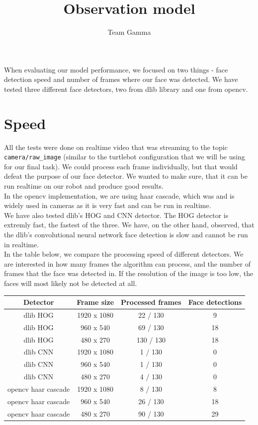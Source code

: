 \documentclass[12pt,a4paper]{report}
\author{Team Gamma}
\title{Observation model}
\date{}
\begin{document}
	
	\maketitle
	
	When evaluating our model performance, we focused on two things - face detection speed and number of frames where our face was detected. We have tested three different face detectors, two from dlib library and one from opencv.
	
	\section{Speed}
	
	All the tests were done on realtime video that was streaming to the topic \texttt{camera/raw\_image} (similar to the turtlebot configuration that we will be using for our final task). We could process each frame individually, but that would defeat the purpose of our face detector. We wanted to make sure, that it can be run realtime on our robot and produce good results. \\
	
	In the opencv implementation, we are using haar cascade, which was and is widely used in cameras as it is very fast and can be run in realtime. \\
	
	We have also tested dlib's HOG and CNN detector. The HOG detector is extremly fast, the fastest of the three. We have, on the other hand, observed, that the dlib's convolutional neural network face detection is slow and cannot be run in realtime. \\
	
	In the table below, we compare the processing speed of different detectors. We are interested in how many frames the algorithm can process, and the number of frames that the face was detected in. If the resolution of the image is too low, the faces will most likely not be detected at all. \\
	
	\begin{center}
		\begin{tabular}{|c|c|c|c|}
			\hline 
			Detector & Frame size & Processed frames & Face detections \\ 
			\hline
			dlib HOG & 1920 x 1080 & 22 / 130 & 9 \\
			dlib HOG & 960 x 540 & 69 / 130 & 18 \\
			dlib HOG & 480 x 270 & 130 / 130 & 18 \\
			dlib CNN & 1920 x 1080 & 1 / 130 & 0 \\
			dlib CNN & 960 x 540 & 1 / 130 & 0 \\
			dlib CNN & 480 x 270 & 4 / 130 & 0 \\
			opencv haar cascade & 1920 x 1080 & 8 / 130 & 8 \\
			opencv haar cascade & 960 x 540 & 26 / 130 & 18 \\
			opencv haar cascade & 480 x 270 & 90 / 130 & 29 \\
			\hline 
		\end{tabular} \\
	\end{center}
	
\end{document}
